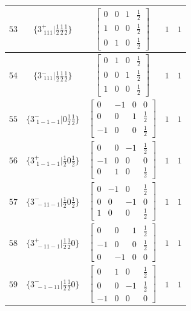 \documentclass[fleqn,8pt]{jsarticle}
\begin{document}
\begin{longtable}{ccccc}
$ 53 $ & $ \{3^{+}_{\,\,111}|\frac{1}{2} \frac{1}{2} \frac{1}{2}\} $ & $ \begin{bmatrix} 0 & 0 & 1 & \frac{1}{2} \\ 1 & 0 & 0 & \frac{1}{2} \\ 0 & 1 & 0 & \frac{1}{2} \end{bmatrix} $ & $ 1 $ & $ 1 $ \\ \hline
$ 54 $ & $ \{3^{-}_{\,\,111}|\frac{1}{2} \frac{1}{2} \frac{1}{2}\} $ & $ \begin{bmatrix} 0 & 1 & 0 & \frac{1}{2} \\ 0 & 0 & 1 & \frac{1}{2} \\ 1 & 0 & 0 & \frac{1}{2} \end{bmatrix} $ & $ 1 $ & $ 1 $ \\ \hline
$ 55 $ & $ \{3^{-}_{\,\,1-1-1}|0 \frac{1}{2} \frac{1}{2}\} $ & $ \begin{bmatrix} 0 & -1 & 0 & 0 \\ 0 & 0 & 1 & \frac{1}{2} \\ -1 & 0 & 0 & \frac{1}{2} \end{bmatrix} $ & $ 1 $ & $ 1 $ \\ \hline
$ 56 $ & $ \{3^{+}_{\,\,1-1-1}|\frac{1}{2} 0 \frac{1}{2}\} $ & $ \begin{bmatrix} 0 & 0 & -1 & \frac{1}{2} \\ -1 & 0 & 0 & 0 \\ 0 & 1 & 0 & \frac{1}{2} \end{bmatrix} $ & $ 1 $ & $ 1 $ \\ \hline
$ 57 $ & $ \{3^{-}_{\,\,-11-1}|\frac{1}{2} 0 \frac{1}{2}\} $ & $ \begin{bmatrix} 0 & -1 & 0 & \frac{1}{2} \\ 0 & 0 & -1 & 0 \\ 1 & 0 & 0 & \frac{1}{2} \end{bmatrix} $ & $ 1 $ & $ 1 $ \\ \hline
$ 58 $ & $ \{3^{+}_{\,\,-11-1}|\frac{1}{2} \frac{1}{2} 0\} $ & $ \begin{bmatrix} 0 & 0 & 1 & \frac{1}{2} \\ -1 & 0 & 0 & \frac{1}{2} \\ 0 & -1 & 0 & 0 \end{bmatrix} $ & $ 1 $ & $ 1 $ \\ \hline
$ 59 $ & $ \{3^{-}_{\,\,-1-11}|\frac{1}{2} \frac{1}{2} 0\} $ & $ \begin{bmatrix} 0 & 1 & 0 & \frac{1}{2} \\ 0 & 0 & -1 & \frac{1}{2} \\ -1 & 0 & 0 & 0 \end{bmatrix} $ & $ 1 $ & $ 1 $ \\ \hline

\end{longtable}
\end{document}
